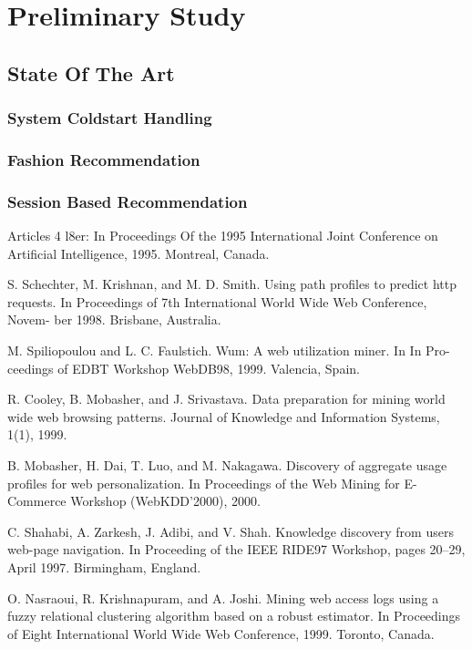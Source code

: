 
\chapter{Preliminary Study}
\minitoc

\clearpage

\section{State Of The Art}
\subsection{System Coldstart Handling}
\subsection{Fashion Recommendation}
\subsection{Session Based Recommendation}
Articles 4 l8er:
In Proceedings Of
the 1995 International Joint Conference on Artificial Intelligence, 1995. Montreal,
Canada.

S. Schechter, M. Krishnan, and M. D. Smith. Using path profiles to predict http
requests. In Proceedings of 7th International World Wide Web Conference, Novem-
ber 1998. Brisbane, Australia.

M. Spiliopoulou and L. C. Faulstich. Wum: A web utilization miner. In In Pro-
ceedings of EDBT Workshop WebDB98, 1999. Valencia, Spain.

R. Cooley, B. Mobasher, and J. Srivastava. Data preparation for mining world wide
web browsing patterns. Journal of Knowledge and Information Systems, 1(1), 1999.

B. Mobasher, H. Dai, T. Luo, and M. Nakagawa. Discovery of aggregate usage
profiles for web personalization. In Proceedings of the Web Mining for E-Commerce
Workshop (WebKDD’2000), 2000.

C. Shahabi, A. Zarkesh, J. Adibi, and V. Shah. Knowledge discovery from users
web-page navigation. In Proceeding of the IEEE RIDE97 Workshop, pages 20–29,
April 1997. Birmingham, England.

O. Nasraoui, R. Krishnapuram, and A. Joshi. Mining web access logs using a fuzzy
relational clustering algorithm based on a robust estimator. In Proceedings of Eight
International World Wide Web Conference, 1999. Toronto, Canada.

